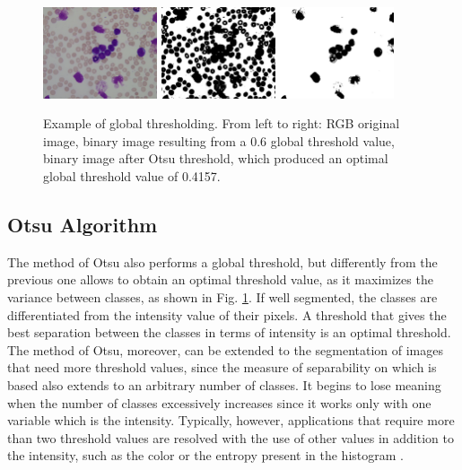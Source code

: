 \begin{figure}[h]
	\centering
	\includegraphics[width=0.3\textwidth]{images/figcs_rgb}
	\includegraphics[width=0.3\textwidth]{images/fig_global}
	\includegraphics[width=0.3\textwidth]{images/fig_otsu}
	\caption[Example of global thresholding.]{\label{fig:otsu}Example of global thresholding. From left to right: RGB original image, binary image resulting from a 0.6 global threshold value, binary image after Otsu threshold, which produced an optimal global threshold value of 0.4157.}
\end{figure}

\subsection{Otsu Algorithm} \label{Otsu} %
The method of Otsu \cite{Otsu} also performs a global threshold, but differently from the previous one allows to obtain an optimal threshold value, as it maximizes the variance between classes, as shown in Fig. \ref{fig:otsu}. If well segmented, the classes are differentiated from the intensity value of their pixels. A threshold that gives the best separation between the classes in terms of intensity is an optimal threshold. The method of Otsu, moreover, can be extended to the segmentation of images that need more threshold values, since the measure of separability on which is based also extends to an arbitrary number of classes. It begins to lose meaning when the number of classes excessively increases since it works only with one variable which is the intensity. Typically, however, applications that require more than two threshold values are resolved with the use of other values in addition to the intensity, such as the color or the entropy present in the histogram \cite{Kapur}.

